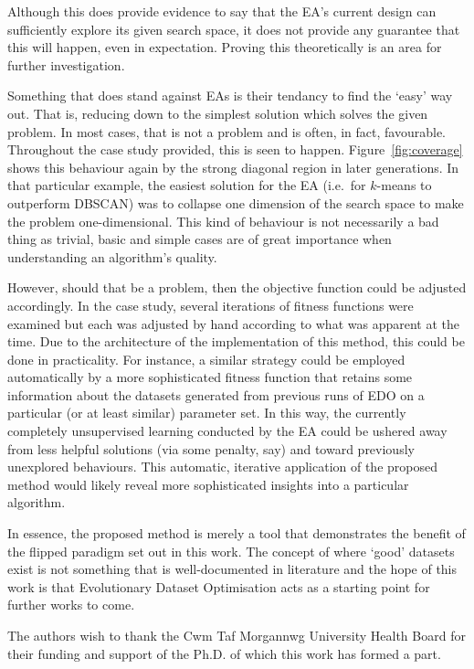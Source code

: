 \documentclass[smallextended]{svjour3}
\begin{document}
Although this does provide evidence to say that the EA's current design can
sufficiently explore its given search space, it does not provide any guarantee
that this will happen, even in expectation. Proving this theoretically is an
area for further investigation.

Something that does stand against EAs is their tendancy to find the `easy' way
out. That is, reducing down to the simplest solution which solves the given
problem. In most cases, that is not a problem and is often, in fact, favourable.
Throughout the case study provided, this is seen to happen.
Figure~\ref{fig:coverage} shows this behaviour again by the strong diagonal
region in later generations. In that particular example, the easiest solution
for the EA (i.e.\ for \(k\)-means to outperform DBSCAN) was to collapse one
dimension of the search space to make the problem one-dimensional. This kind of
behaviour is not necessarily a bad thing as trivial, basic and simple cases are
of great importance when understanding an algorithm's quality.

However, should that be a problem, then the objective function could be adjusted
accordingly. In the case study, several iterations of fitness functions were
examined but each was adjusted by hand according to what was apparent at the
time. Due to the architecture of the implementation of this method, this could
be done in practicality. For instance, a similar strategy could be employed
automatically by a more sophisticated fitness function that retains some
information about the datasets generated from previous runs of EDO on a
particular (or at least similar) parameter set. In this way, the currently
completely unsupervised learning conducted by the EA could be ushered away from
less helpful solutions (via some penalty, say) and toward previously unexplored
behaviours. This automatic, iterative application of the proposed method would
likely reveal more sophisticated insights into a particular algorithm.

In essence, the proposed method is merely a tool that demonstrates the benefit
of the flipped paradigm set out in this work. The concept of where `good'
datasets exist is not something that is well-documented in literature and the
hope of this work is that Evolutionary Dataset Optimisation acts as a starting
point for further works to come.



\begin{acknowledgements}
    The authors wish to thank the Cwm Taf Morgannwg University Health Board for
    their funding and support of the Ph.D. of which this work has formed a part.

\end{acknowledgements}
\end{document}

